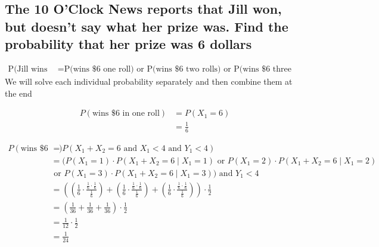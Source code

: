 \documentclass{article}
\numberwithin{equation}{section}
\newcommand{\A}{\text{ and }}
\newcommand{\R}{\text{ or }}
\newcommand{\eqname}[1]{\tag*{#1}}%
\begin{document}
\pagebreak
\subsection{The 10 O'Clock News reports that Jill won, but doesn't say what her prize was. Find the probability that her prize was 6 dollars} 
\begin{align}
        \label{P(Jill Wins 6)}
        \text{P(Jill wins \$6)} &= \text{P(wins \$6 one roll) or P(wins \$6 two rolls) or P(wins \$6 three rolls) or P(wins \$6 four rolls)}
\end{align}
We will solve each individual probability separately and then combine them at the end

\begin{align}
        \label{P(Win 6 1 Roll Total)}
        P(\text{wins \$6 in one roll}) &= P(X_1 = 6) \eqname{} \\
        &= \frac{1}{6}
\end{align}

\begin{align}
        \label{P(Win 6 2 Roll Total)}
        P(\text{wins \$6 in two rolls}) &= P(X_1 + X_2 = 6 \A X_1 < 4 \A Y_1 < 4) \eqname{} \\
        &= (P(X_1 = 1) \cdot P(X_1 + X_2 = 6 \mid X_1 = 1) \R P(X_1 = 2) \cdot P(X_1 + X_2 = 6 \mid X_1 = 2) \eqname{} \\
        & \R P(X_1 = 3) \cdot P(X_1 + X_2 = 6 \mid X_1 = 3)) \A Y_1 < 4 \eqname{} \\
        &= \left((\frac{1}{6} \cdot \frac{\frac{1}{6} \cdot \frac{1}{6}}{\frac{1}{6}}) + (\frac{1}{6} \cdot \frac{\frac{1}{6} \cdot \frac{1}{6}}{\frac{1}{6}}) + (\frac{1}{6} \cdot \frac{\frac{1}{6} \cdot \frac{1}{6}}{\frac{1}{6}}) \right) \cdot \frac{1}{2} \eqname{} \\
        &= (\frac{1}{36} + \frac{1}{36} + \frac{1}{36}) \cdot \frac{1}{2} \eqname{} \\
        &= \frac{1}{12} \cdot \frac{1}{2} \eqname{} \\
        &= \frac{1}{24}
\end{align}
\end{document}
